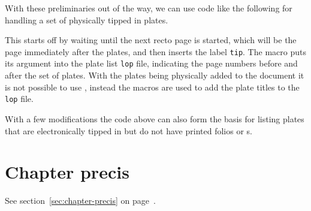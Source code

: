     With these preliminaries out of the way, we can use code like the 
following for handling a set of physically tipped in plates.
\begin{lcode}
\end{lcode}
This starts off by waiting until the next recto page is started, which
will be the page immediately after the plates, and then inserts the 
label \texttt{tip}. The \cmd{\addtocontents} macro puts its argument
into the plate list \texttt{lop} file, indicating the page numbers 
before and after the set of plates. With the plates being physically 
added to the document it is not possible to use \cmd{\caption}, 
instead the \cmd{\addcontentsline} macros are used to add the plate 
titles to the \texttt{lop} file.

    With a few modifications the code above can also form the basis 
for listing plates that are electronically tipped in but do not have 
printed folios or \cmd{\caption}s.




\section{Chapter precis}

See section~\ref{sec:chapter-precis} on page~\pageref{sec:chapter-precis}.





